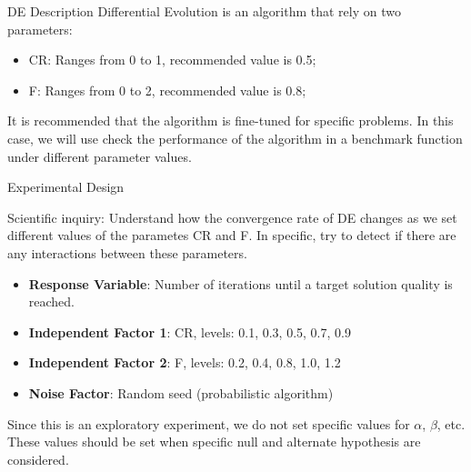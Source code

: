 \begin{frame}[t]{DE Description}{}
  Differential Evolution is an algorithm that rely on two parameters:
  \begin{itemize}
  \item CR: Ranges from 0 to 1, recommended value is 0.5;
  \item F: Ranges from 0 to 2, recommended value is 0.8;
  \end{itemize}\bigskip

  It is recommended that the algorithm is fine-tuned for specific
  problems. In this case, we will use check the performance of the
  algorithm in a benchmark function under different parameter values.
\end{frame}

\begin{frame}[t]{Experimental Design}{}

  Scientific inquiry: Understand how the convergence rate of DE
  changes as we set different values of the parametes CR and F. In
  specific, try to detect if there are any interactions between these
  parameters.\bigskip
  
  \begin{itemize}
  \item {\bf Response Variable}: Number of iterations until a target solution quality is reached.
  \item {\bf Independent Factor 1}: CR, levels: 0.1, 0.3, 0.5, 0.7, 0.9
  \item {\bf Independent Factor 2}: F, levels: 0.2, 0.4, 0.8, 1.0, 1.2
  \item {\bf Noise Factor}: Random seed (probabilistic algorithm)
  \end{itemize}
  \bigskip

  Since this is an exploratory experiment, we do not set specific
  values for $\alpha$, $\beta$, etc. These values should be set when
  specific null and alternate hypothesis are considered.  
\end{frame}


